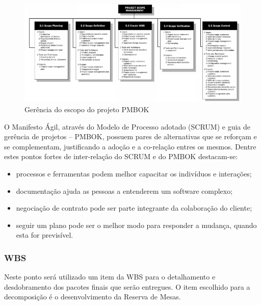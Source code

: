 \begin{figure}[H]
  \centering
  \includegraphics[width=1\textwidth]{softwareengineer/images/pmbok-management} 
  \caption{Gerência do escopo do projeto PMBOK}
  \label{fig:pmbok-management} 
\end{figure}

O Manifesto Ágil, através do Modelo de Processo adotado (SCRUM) e guia de gerência de projetos – PMBOK, possuem pares de alternativas que se reforçam e se complementam, justificando a adoção e a co-relação entres os mesmos. Dentre estes pontos fortes de inter-relação do SCRUM e do PMBOK destacam-se:
\begin{itemize}
\item processos e ferramentas podem melhor capacitar os indivíduos e interações;
\item documentação ajuda as pessoas a entenderem um software complexo;
\item negociação de contrato pode ser parte integrante da colaboração do cliente;
\item seguir um plano pode ser o melhor modo para responder a mudança, quando esta for previsível.
\end{itemize}


\subsubsection{WBS}

Neste ponto será utilizado um item da WBS para o detalhamento e desdobramento dos pacotes finais que serão entregues. O item escolhido para a decomposição é o desenvolvimento da Reserva de Mesas.

